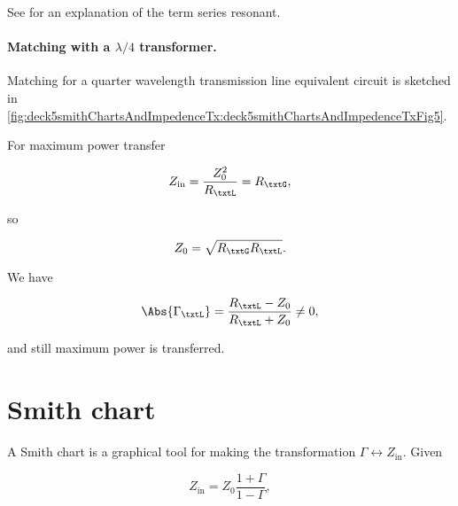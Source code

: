 See \citep{seriesResonance} for an explanation of the term series resonant.

\paragraph{Matching with a \( \lambda/4 \) transformer.}

Matching for a quarter wavelength transmission line equivalent circuit is sketched in \cref{fig:deck5smithChartsAndImpedenceTx:deck5smithChartsAndImpedenceTxFig5}.


For maximum power transfer

\begin{equation}\label{eqn:uwavesDeck5SmithChartCore:300}
Z_{\textrm{in}} = \frac{Z_0^2}{R_\txtL} = R_\txtG, 
\end{equation}

so

\begin{equation}\label{eqn:uwavesDeck5SmithChartCore:320}
Z_0 = \sqrt{ R_\txtG R_\txtL }.
\end{equation}

We have

\begin{equation}\label{eqn:uwavesDeck5SmithChartCore:340}
\Abs{\Gamma_\txtL} = \frac{ R_\txtL - Z_0 }{R_\txtL + Z_0} \ne 0,
\end{equation}

and still maximum power is transferred.

\section{Smith chart}

A Smith chart is a graphical tool for making the transformation \( \Gamma \leftrightarrow Z_{\textrm{in}} \).  Given

\begin{equation}\label{eqn:uwavesDeck5SmithChartCore:360}
Z_{\textrm{in}} = Z_0 \frac{ 1 + \Gamma }{ 1 - \Gamma },
\end{equation}

